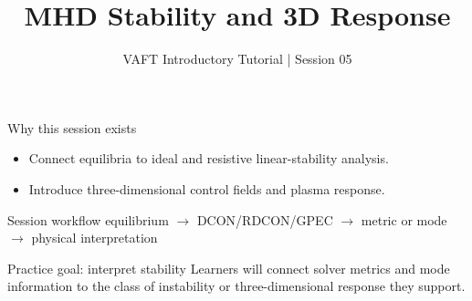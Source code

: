 \documentclass[aspectratio=169]{beamer}
\title{MHD Stability and 3D Response}
\subtitle{VAFT Introductory Tutorial | Session 05}
\author{}
\date{}
\begin{document}
\begin{frame}
  \titlepage
\end{frame}

\begin{frame}{Why this session exists}
  \begin{itemize}
    \item Connect equilibria to ideal and resistive linear-stability analysis.
    \item Introduce three-dimensional control fields and plasma response.
  \end{itemize}
\end{frame}

\begin{frame}{Session workflow}
  \centering
  equilibrium \(\rightarrow\) DCON/RDCON/GPEC \(\rightarrow\)
  metric or mode \(\rightarrow\) physical interpretation
\end{frame}

\begin{frame}{Practice goal: interpret stability}
  Learners will connect solver metrics and mode information to the class of
  instability or three-dimensional response they support.
\end{frame}
\end{document}
